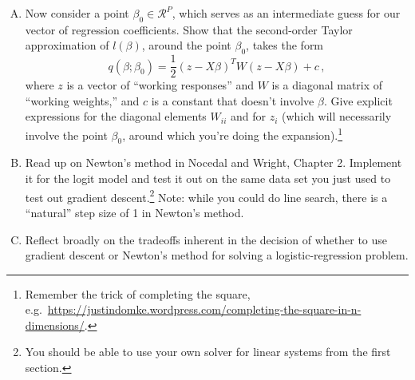 \documentclass{mynotes}
\begin{document}
\begin{enumerate}[(A)]
\item Now consider a point $\beta_0 \in \mathcal{R}^P$, which serves as an
intermediate guess for our vector of regression coefficients. Show that the
second-order Taylor approximation of $l(\beta)$, around the point $\beta_0$,
takes the form
$$
q(\beta; \beta_0) = \frac{1}{2}(z - X \beta)^T W (z - X \beta) + c\, ,
$$
where $z$ is a vector of ``working responses'' and $W$ is a diagonal matrix of
``working weights,'' and $c$ is a constant that doesn't involve $\beta$. Give
explicit expressions for the diagonal elements $W_{ii}$ and for $z_i$ (which
will necessarily involve the point $\beta_0$, around which you're doing the
expansion).\footnote{Remember the trick of completing the square,
e.g.~\url{https://justindomke.wordpress.com/completing-the-square-in-n-dimensions/}.}

\item Read up on Newton's method in Nocedal and Wright, Chapter 2. Implement it
for the logit model and test it out on the same data set you just used to test
out gradient descent.\footnote{You should be able to use your own solver for
linear systems from the first section.} Note: while you could do line search,
there is a ``natural'' step size of 1 in Newton's method.

\item Reflect broadly on the tradeoffs inherent in the decision of whether to
use gradient descent or Newton's method for solving a logistic-regression
problem.




\end{enumerate}
\end{document}
